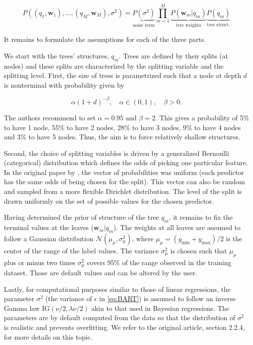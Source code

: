 \begin{equation}
\label{eq:bart1}
P(\left(q_1,\textbf{w}_1\right),\dots,\left(q_M,\textbf{w}_M\right),\sigma^2)=\underbrace{P(\sigma^2)}_{\text{noise term}}\prod_{m=1}^M\underbrace{P\left(\textbf{w}_m|q_m\right)}_{\text{tree weights}}\underbrace{P(q_m)}_{\text{tree struct.}}
\end{equation}

It remains to formulate the assumptions for each of the three parts.

We start with the trees' structures, $q_m$. Trees are defined by their splits (at nodes) and these splits are characterized by the splitting variable and the splitting level. First, the size of trees is parametrized such that a node at depth $d$ is nonterminal with probability given by

\begin{equation}
\label{eq:bartnode}
\alpha(1+d)^{-\beta}, \quad \alpha \in (0,1), \quad \beta >0.
\end{equation}

The authors recommend to set $\alpha = 0.95$ and $\beta=2$. This gives a probability of 5\% to have 1 node, 55\% to have 2 nodes, 28\% to have 3 nodes, 9\% to have 4 nodes and 3\% to have 5 nodes. Thus, the aim is to force relatively shallow structures.

Second, the choice of splitting variables is driven by a generalized Bernoulli (categorical) distribution which defines the odds of picking one particular feature. In the original paper by \cite{chipman2010bart}, the vector of probabilities was uniform (each predictor has the same odds of being chosen for the split). This vector can also be random and sampled from a more flexible Dirichlet distribution. The level of the split is drawn uniformly on the set of possible values for the chosen predictor.

Having determined the prior of structure of the tree $q_m$, it remains to fix the terminal values at the leaves ($\textbf{w}_m|q_m$). The weights at all leaves are assumed to follow a Gaussian distribution $\mathcal{N}(\mu_\mu,\sigma_\mu^2)$, where $\mu_\mu=(y_\text{min}+y_\text{max})/2$ is the center of the range of the label values. The variance $\sigma_\mu^2$ is chosen such that $\mu_\mu$ plus or minus two times $\sigma_\mu^2$ covers 95\% of the range observed in the training dataset. Those are default values and can be altered by the user.

Lastly, for computational purposes similar to those of linear regressions, the parameter $\sigma^2$ (the variance of $\epsilon$ in \ref{eq:BART}) is assumed to follow an inverse Gamma law $\text{IG}(\nu/2,\lambda \nu/2)$ akin to that used in Bayesian regressions. The parameters are by default computed from the data so that the distribution of $\sigma^2$ is realistic and prevents overfitting. We refer to the original article, section 2.2.4, for more details on this topic.

